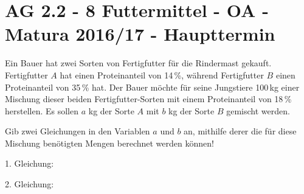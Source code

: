 \section{AG 2.2 - 8 Futtermittel - OA - Matura 2016/17 - Haupttermin}

\begin{beispiel}[AG 2.2]{1} %
Ein Bauer hat zwei Sorten von Fertigfutter für die Rindermast gekauft. Fertigfutter $A$ hat einen Proteinanteil von 14\,\%, während Fertigfutter $B$ einen Proteinanteil von 35\,\% hat.
Der Bauer möchte für seine Jungstiere 100\,kg einer Mischung dieser beiden Fertigfutter-Sorten
mit einem Proteinanteil von 18\,\% herstellen. Es sollen $a$ kg der Sorte $A$ mit $b$ kg der Sorte $B$ gemischt werden.\leer

Gib zwei Gleichungen in den Variablen $a$ und $b$ an, mithilfe derer die für diese Mischung benötigten Mengen berechnet werden können!\leer


1. Gleichung:  \leer

2. Gleichung: 
\end{beispiel}